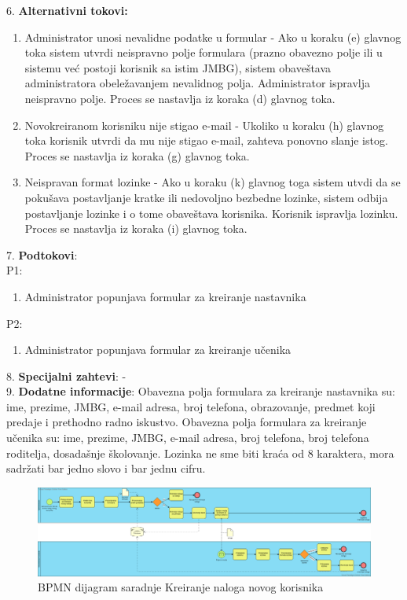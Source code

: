 \documentclass{article}
\begin{document}
6. \textbf{Alternativni tokovi:}
\begin{enumerate} [label=(\roman*)]
\item Administrator unosi nevalidne podatke u formular - Ako u koraku (e) glavnog toka sistem utvrdi neispravno polje formulara (prazno obavezno polje ili u sistemu već postoji korisnik sa istim JMBG), sistem obaveštava administratora obeležavanjem nevalidnog polja. Administrator ispravlja neispravno polje. Proces se nastavlja iz koraka (d) glavnog toka.
\item Novokreiranom korisniku nije stigao e-mail - Ukoliko u koraku (h) glavnog toka korisnik utvrdi da mu nije stigao e-mail, zahteva ponovno slanje istog. Proces se nastavlja iz koraka (g) glavnog toka.
\item Neispravan format lozinke - Ako u koraku (k) glavnog toga sistem utvdi da se pokušava postavljanje kratke ili nedovoljno bezbedne lozinke, sistem odbija postavljanje lozinke i o tome obaveštava korisnika. Korisnik ispravlja lozinku. Proces se nastavlja iz koraka (i) glavnog toka.
\end{enumerate}

7. \textbf{Podtokovi}: \\
P1:
\begin{enumerate} [label=(\alph*)]
\item Administrator popunjava formular za kreiranje nastavnika
\end{enumerate}
P2:
\begin{enumerate} [label=(\alph*)]
\item Administrator popunjava formular za kreiranje učenika
\end{enumerate}

8. \textbf{Specijalni zahtevi}: - \\

9. \textbf{Dodatne informacije}: Obavezna polja formulara za kreiranje nastavnika su: ime, prezime, JMBG, e-mail adresa, broj telefona, obrazovanje, predmet koji predaje i prethodno radno iskustvo. Obavezna polja formulara za kreiranje učenika su: ime, prezime, JMBG, e-mail adresa, broj telefona, broj telefona roditelja, dosadašnje školovanje. Lozinka ne sme biti kraća od 8 karaktera, mora sadržati bar jedno slovo i bar jednu cifru. \\

\begin{landscape}
\begin{figure} [!ht]
    \begin{center}
        \includegraphics[scale=0.28]{imgs/BPMN_kreiranje_korisnika.png}
    \end{center}
\caption{BPMN dijagram saradnje Kreiranje naloga novog korisnika}
\end{figure}
\end{landscape}
\end{document}
